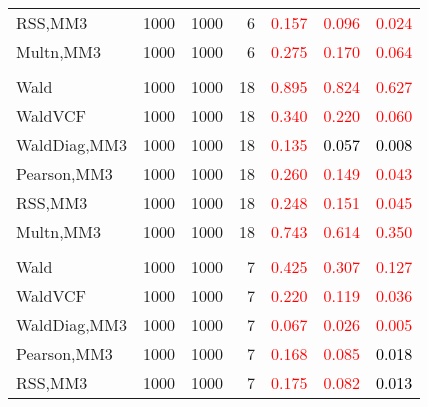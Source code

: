 \documentclass[
]{article}
\begin{document}
\begin{table}[H]
{\begin{tabular}[t]{lrrrrrr}
\hspace{1em}RSS,MM3 & 1000 & 1000 & 6 & \textcolor{red}{0.157} & \textcolor{red}{0.096} & \textcolor{red}{0.024}\\
\hspace{1em}Multn,MM3 & 1000 & 1000 & 6 & \textcolor{red}{0.275} & \textcolor{red}{0.170} & \textcolor{red}{0.064}\\
\addlinespace[0.3em]
\multicolumn{7}{l}{\textbf{1F 15V}}\\
\hspace{1em}Wald & 1000 & 1000 & 18 & \textcolor{red}{0.895} & \textcolor{red}{0.824} & \textcolor{red}{0.627}\\
\hspace{1em}WaldVCF & 1000 & 1000 & 18 & \textcolor{red}{0.340} & \textcolor{red}{0.220} & \textcolor{red}{0.060}\\
\hspace{1em}WaldDiag,MM3 & 1000 & 1000 & 18 & \textcolor{red}{0.135} & \textcolor{black}{0.057} & \textcolor{black}{0.008}\\
\hspace{1em}Pearson,MM3 & 1000 & 1000 & 18 & \textcolor{red}{0.260} & \textcolor{red}{0.149} & \textcolor{red}{0.043}\\
\hspace{1em}RSS,MM3 & 1000 & 1000 & 18 & \textcolor{red}{0.248} & \textcolor{red}{0.151} & \textcolor{red}{0.045}\\
\hspace{1em}Multn,MM3 & 1000 & 1000 & 18 & \textcolor{red}{0.743} & \textcolor{red}{0.614} & \textcolor{red}{0.350}\\
\addlinespace[0.3em]
\multicolumn{7}{l}{\textbf{2F 10V}}\\
\hspace{1em}Wald & 1000 & 1000 & 7 & \textcolor{red}{0.425} & \textcolor{red}{0.307} & \textcolor{red}{0.127}\\
\hspace{1em}WaldVCF & 1000 & 1000 & 7 & \textcolor{red}{0.220} & \textcolor{red}{0.119} & \textcolor{red}{0.036}\\
\hspace{1em}WaldDiag,MM3 & 1000 & 1000 & 7 & \textcolor{red}{0.067} & \textcolor{red}{0.026} & \textcolor{red}{0.005}\\
\hspace{1em}Pearson,MM3 & 1000 & 1000 & 7 & \textcolor{red}{0.168} & \textcolor{red}{0.085} & \textcolor{black}{0.018}\\
\hspace{1em}RSS,MM3 & 1000 & 1000 & 7 & \textcolor{red}{0.175} & \textcolor{red}{0.082} & \textcolor{black}{0.013}\\

\end{tabular}}
\end{table}
\end{document}
